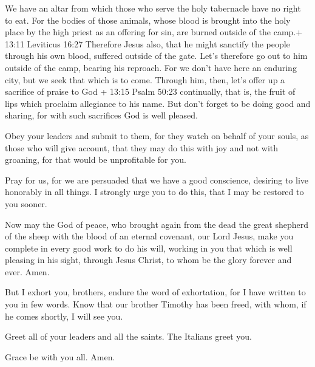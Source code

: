  We have an altar from which those who serve the holy
tabernacle have no right to eat.  For the bodies of those
animals, whose blood is brought into the holy place by the high priest
as an offering for sin, are burned outside of the camp.+ 13:11 Leviticus
16:27  Therefore Jesus also, that he might sanctify the
people through his own blood, suffered outside of the gate.
 Let's therefore go out to him outside of the camp, bearing
his reproach.  For we don't have here an enduring city, but
we seek that which is to come.  Through him, then, let's
offer up a sacrifice of praise to God + 13:15 Psalm 50:23 continually,
that is, the fruit of lips which proclaim allegiance to his name.
 But don't forget to be doing good and sharing, for with
such sacrifices God is well pleased.

 Obey your leaders and submit to them, for they watch on
behalf of your souls, as those who will give account, that they may do
this with joy and not with groaning, for that would be unprofitable for
you.

 Pray for us, for we are persuaded that we have a good
conscience, desiring to live honorably in all things.  I
strongly urge you to do this, that I may be restored to you sooner.

 Now may the God of peace, who brought again from the dead
the great shepherd of the sheep with the blood of an eternal covenant,
our Lord Jesus,  make you complete in every good work to do
his will, working in you that which is well pleasing in his sight,
through Jesus Christ, to whom be the glory forever and ever. Amen.

 But I exhort you, brothers, endure the word of
exhortation, for I have written to you in few words.  Know
that our brother Timothy has been freed, with whom, if he comes shortly,
I will see you.

 Greet all of your leaders and all the saints. The Italians
greet you.

 Grace be with you all. Amen.
